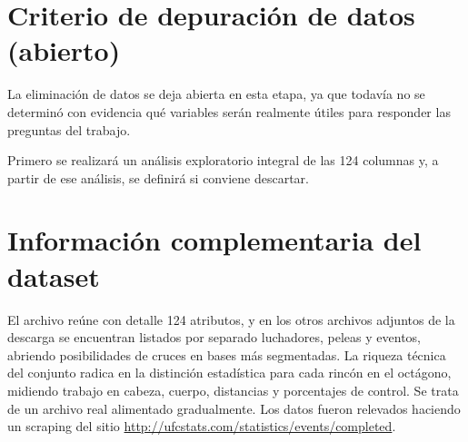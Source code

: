 \documentclass[11pt,a4paper]{article}
\begin{document}
\section{Criterio de depuración de datos (abierto)}

La eliminación de datos se deja abierta en esta etapa, ya que todavía no se determinó con evidencia qué variables serán realmente útiles para responder las preguntas del trabajo.

Primero se realizará un análisis exploratorio integral de las 124 columnas y, a partir de ese análisis, se definirá si conviene descartar.

\section{Información complementaria del dataset}

El archivo  reúne con detalle 124 atributos, y en los otros archivos adjuntos de la descarga se encuentran listados por separado luchadores, peleas y eventos, abriendo posibilidades de cruces en bases más segmentadas. La riqueza técnica del conjunto radica en la distinción estadística para cada rincón en el octágono, midiendo trabajo en cabeza, cuerpo, distancias y porcentajes de control. Se trata de un archivo real alimentado gradualmente.
\samepage
Los datos fueron relevados haciendo un scraping del sitio \url{http://ufcstats.com/statistics/events/completed}. 
\end{document}
